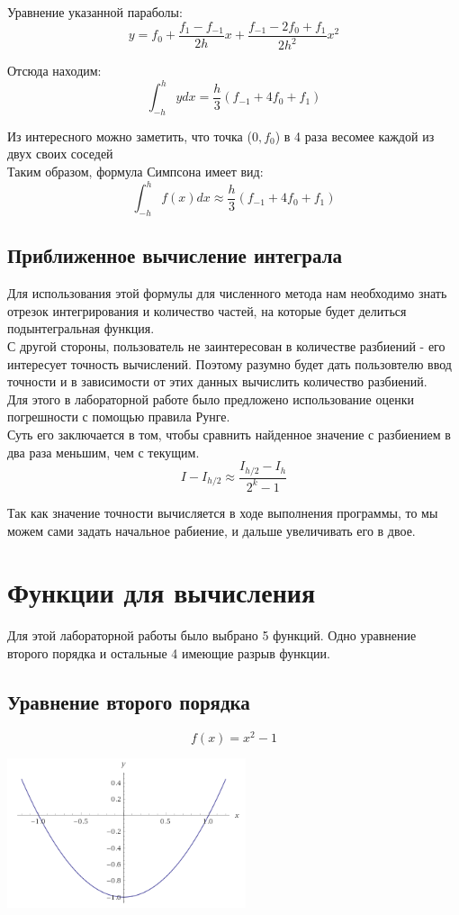 \documentclass[11pt, english]{article}
\begin{document}
Уравнение указанной параболы:
$$y = f_0 + \frac{f_1 - f_{-1}}{2h} x + \frac{f_{-1} - 2f_0 + f_1}{2h^2} x^2$$

Отсюда находим:
$$\int_{-h}^h y dx = \frac{h}{3}(f_{-1} + 4f_0 + f_1)$$

Из интересного можно заметить, что точка ($0, f_0$) в 4 раза весомее каждой из двух своих соседей\\

Таким образом, формула Симпсона имеет вид:
$$\int_{-h}^h f(x) dx \approx \frac{h}{3}(f_{-1} + 4f_0 + f_1)$$


\subsection{Приближенное вычисление интеграла}

Для использования этой формулы для численного метода нам необходимо знать отрезок интегрирования и количество частей, на которые будет делиться подынтегральная функция.\\

С другой стороны, пользователь не заинтересован в количестве разбиений - его интересует точность вычислений. Поэтому разумно будет дать пользовтелю ввод точности и в зависимости от этих данных вычислить количество разбиений. \\

Для этого в лабораторной работе было предложено использование оценки погрешности с помощью правила Рунге.\\

Суть его заключается в том, чтобы сравнить найденное значение с разбиением в два раза меньшим, чем с текущим.
$$I - I_{h/2} \approx \frac{I_{h/2} - I_h}{2^k - 1}$$

Так как значение точности вычисляется в ходе выполнения программы, то мы можем сами задать начальное рабиение, и дальше увеличивать его в двое.

\section{Функции для вычисления}
Для этой лабораторной работы было выбрано 5 функций. Одно уравнение второго порядка и остальные 4 имеющие разрыв функции.

\subsection{Уравнение второго порядка}
$$f(x) = x^2 - 1$$
\begin{center}
    \includegraphics[width=7cm]{2-func.png}
\end{center}
\end{document}
